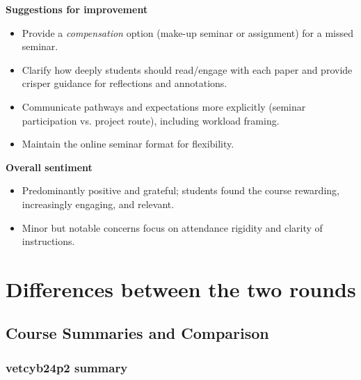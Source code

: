 \documentclass[a4paper]{report}
\begin{document}
\textbf{Suggestions for improvement}
\begin{itemize}
\item Provide a \textit{compensation} option (make-up seminar or assignment) for a missed seminar.
\item Clarify how deeply students should read/engage with each paper and provide crisper guidance for reflections and annotations.
\item Communicate pathways and expectations more explicitly (seminar participation vs. project route), including workload framing.
\item Maintain the online seminar format for flexibility.
\end{itemize}

\textbf{Overall sentiment}
\begin{itemize}
\item Predominantly positive and grateful; students found the course rewarding, increasingly engaging, and relevant.
\item Minor but notable concerns focus on attendance rigidity and clarity of instructions.
\end{itemize}


\chapter{Differences between the two rounds}

\section*{Course Summaries and Comparison}

\subsection*{vetcyb24p2 summary}
\end{document}
